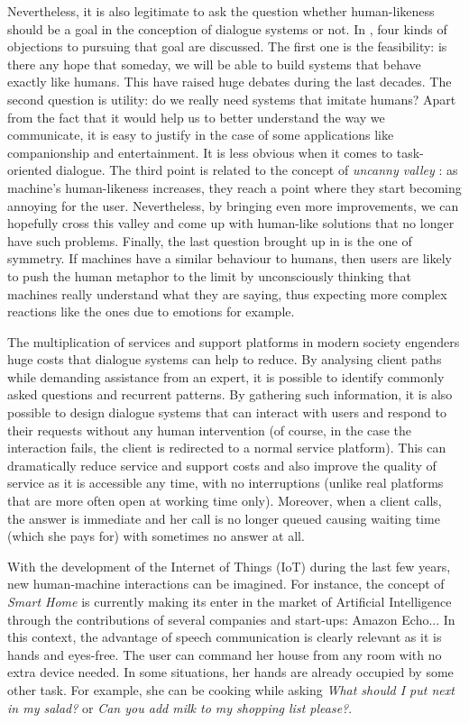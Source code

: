 	Nevertheless, it is also legitimate to ask the question whether human-likeness should be a goal in the conception of dialogue systems or not. In \cite{Edlund2008}, four kinds of objections to pursuing that goal are discussed. The first one is the feasibility: is there any hope that someday, we will be able to build systems that behave exactly like humans. This have raised huge debates during the last decades. The second question is utility: do we really need systems that imitate humans? Apart from the fact that it would help us to better understand the way we communicate, it is easy to justify in the case of some applications like companionship and entertainment. It is less obvious when it comes to task-oriented dialogue. The third point is related to the concept of \textit{uncanny valley} \cite{Mori1970}: as machine's human-likeness increases, they reach a point where they start becoming annoying for the user. Nevertheless, by bringing even more improvements, we can hopefully cross this valley and come up with human-like solutions that no longer have such problems. Finally, the last question brought up in \cite{Edlund2008} is the one of symmetry. If machines have a similar behaviour to humans, then users are likely to push the human metaphor to the limit by unconsciously thinking that machines really understand what they are saying, thus expecting more complex reactions like the ones due to emotions for example.

        The multiplication of services and support platforms in modern society engenders huge costs that dialogue systems can help to reduce. By analysing client paths while demanding assistance from an expert, it is possible to identify commonly asked questions and recurrent patterns. By gathering such information, it is also possible to design dialogue systems that can interact with users and respond to their requests without any human intervention (of course, in the case the interaction fails, the client is redirected to a normal service platform). This can dramatically reduce service and support costs and also improve the quality of service as it is accessible any time, with no interruptions (unlike real platforms that are more often open at working time only). Moreover, when a client calls, the answer is immediate and her call is no longer queued causing waiting time (which she pays for) with sometimes no answer at all.

	With the development of the Internet of Things (IoT) during the last few years, new human-machine interactions can be imagined. For instance, the concept of \textit{Smart Home} is currently making its enter in the market of Artificial Intelligence through the contributions of several companies and start-ups: Amazon Echo... In this context, the advantage of speech communication is clearly relevant as it is hands and eyes-free. The user can command her house from any room with no extra device needed. In some situations, her hands are already occupied by some other task. For example, she can be cooking \cite{Laroche2013} while asking \textit{What should I put next in my salad?} or \textit{Can you add milk to my shopping list please?}.

